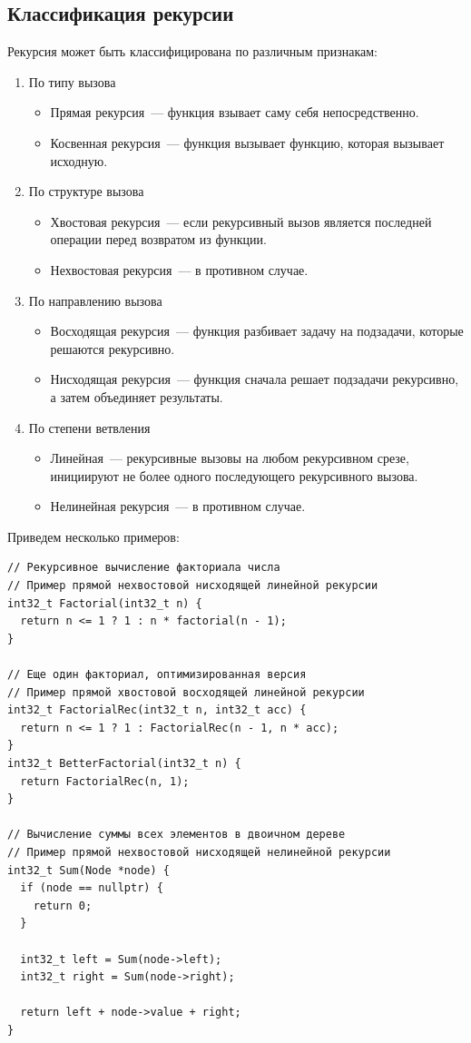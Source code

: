 \subsection{Классификация рекурсии}
Рекурсия может быть классифицирована по различным признакам:
\begin{enumerate}
  \item По типу вызова
        \begin{itemize}
          \item Прямая рекурсия~--- функция взывает саму себя непосредственно.
          \item Косвенная рекурсия~--- функция вызывает функцию, которая вызывает исходную.
        \end{itemize}
  \item По структуре вызова
        \begin{itemize}
          \item Хвостовая рекурсия~--- если рекурсивный вызов является последней операции перед возвратом из функции.
          \item Нехвостовая рекурсия~--- в противном случае.
        \end{itemize}
  \item По направлению вызова
        \begin{itemize}
          \item Восходящая рекурсия~--- функция разбивает задачу на подзадачи, которые решаются рекурсивно.
          \item Нисходящая рекурсия~--- функция сначала решает подзадачи рекурсивно, а затем объединяет результаты.
        \end{itemize}
  \item По степени ветвления
        \begin{itemize}
          \item Линейная~--- рекурсивные вызовы на любом рекурсивном срезе, инициируют не более одного последующего рекурсивного вызова.
          \item Нелинейная рекурсия~--- в противном случае.
        \end{itemize}
\end{enumerate}

Приведем несколько примеров:
\begin{verbatim}
// Рекурсивное вычисление факториала числа
// Пример прямой нехвостовой нисходящей линейной рекурсии
int32_t Factorial(int32_t n) {
  return n <= 1 ? 1 : n * factorial(n - 1);
}

// Еще один факториал, оптимизированная версия
// Пример прямой хвостовой восходящей линейной рекурсии
int32_t FactorialRec(int32_t n, int32_t acc) {
  return n <= 1 ? 1 : FactorialRec(n - 1, n * acc);
}
int32_t BetterFactorial(int32_t n) {
  return FactorialRec(n, 1);
}

// Вычисление суммы всех элементов в двоичном дереве
// Пример прямой нехвостовой нисходящей нелинейной рекурсии
int32_t Sum(Node *node) {
  if (node == nullptr) {
    return 0;
  }

  int32_t left = Sum(node->left);
  int32_t right = Sum(node->right);

  return left + node->value + right;
}
\end{verbatim}

